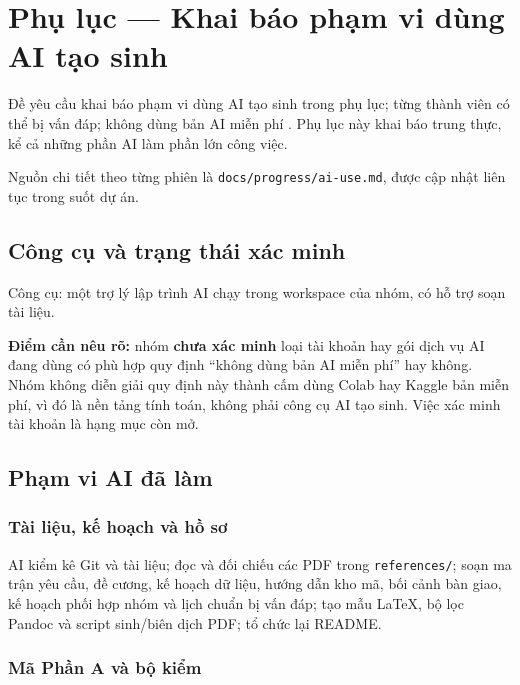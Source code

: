 \appendix
\section{Phụ lục --- Khai báo phạm vi dùng AI tạo sinh}
\label{sec:phu-luc-ai}

Đề yêu cầu khai báo phạm vi dùng AI tạo sinh trong phụ lục; từng thành viên có thể
bị vấn đáp; không dùng bản AI miễn phí \cite[tr.~2, mục II]{de}. Phụ lục này khai
báo trung thực, kể cả những phần AI làm phần lớn công việc.

Nguồn chi tiết theo từng phiên là \texttt{docs/progress/ai-use.md}, được cập nhật
liên tục trong suốt dự án.

\subsection{Công cụ và trạng thái xác minh}

Công cụ: một trợ lý lập trình AI chạy trong workspace của nhóm, có hỗ trợ soạn tài
liệu.

\textbf{Điểm cần nêu rõ:} nhóm \textbf{chưa xác minh} loại tài khoản hay gói dịch
vụ AI đang dùng có phù hợp quy định ``không dùng bản AI miễn phí'' hay không. Nhóm
không diễn giải quy định này thành cấm dùng Colab hay Kaggle bản miễn phí, vì đó là
nền tảng tính toán, không phải công cụ AI tạo sinh. Việc xác minh tài khoản là hạng
mục còn mở.

\subsection{Phạm vi AI đã làm}

\subsubsection{Tài liệu, kế hoạch và hồ sơ}

AI kiểm kê Git và tài liệu; đọc và đối chiếu các PDF trong \texttt{references/};
soạn ma trận yêu cầu, đề cương, kế hoạch dữ liệu, hướng dẫn kho mã, bối cảnh bàn
giao, kế hoạch phối hợp nhóm và lịch chuẩn bị vấn đáp; tạo mẫu LaTeX, bộ lọc Pandoc
và script sinh/biên dịch PDF; tổ chức lại README.

\subsubsection{Mã Phần A và bộ kiểm}

